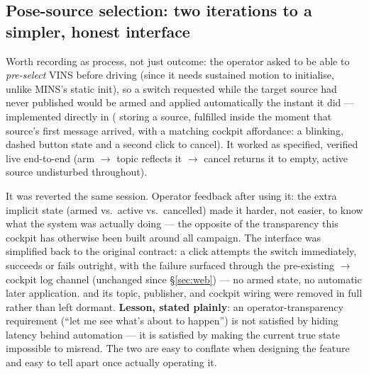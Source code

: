 \subsection{Pose-source selection: two iterations to a simpler, honest
interface}
\label{sec:july23selector}
Worth recording as process, not just outcome: the operator asked to be able
to \emph{pre-select} VINS before driving (since it needs sustained motion to
initialise, unlike MINS's static init), so a switch requested while the
target source had never published would be armed and applied automatically
the instant it did — implemented directly in 
( storing a  source, fulfilled inside
 the moment that source's first message arrived, with a
matching cockpit affordance: a blinking, dashed button state and a second
click to cancel). It worked as specified, verified live end-to-end
(arm $\to$  topic reflects it $\to$ cancel
returns it to empty, active source undisturbed throughout).

It was reverted the same session. Operator feedback after using it: the
extra implicit state (armed vs.\ active vs.\ cancelled) made it harder, not
easier, to know what the system was actually doing — the opposite of the
transparency this cockpit has otherwise been built around all campaign. The
interface was simplified back to the original contract: a click attempts
the switch immediately, succeeds or fails outright, with the failure
surfaced through the pre-existing  $\to$ cockpit log
channel (unchanged since \S\ref{sec:web}) — no armed state, no automatic
later application.  and its topic, publisher,
and cockpit wiring were removed in full rather than left dormant.
\textbf{Lesson, stated plainly}: an operator-transparency requirement
(``let me see what's about to happen'') is not satisfied by hiding latency
behind automation — it is satisfied by making the current true state
impossible to misread. The two are easy to conflate when designing the
feature and easy to tell apart once actually operating it.

